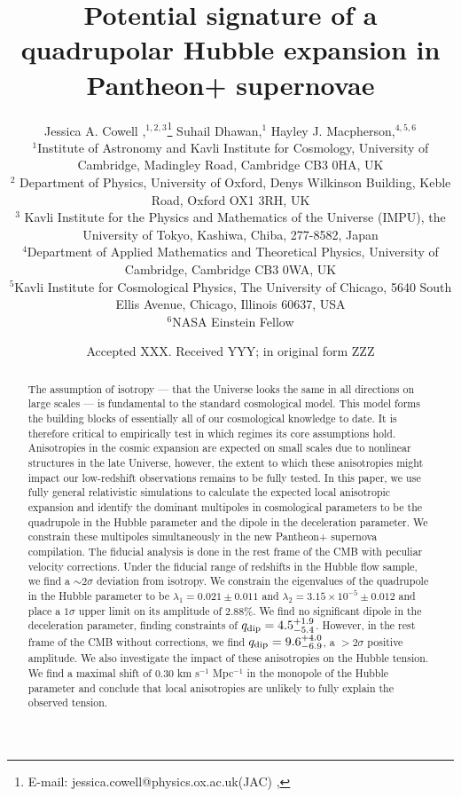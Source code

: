 \documentclass[fleqn,usenatbib]{mnras}
\title[Constraints on a quadrupolar expansion in Pantheon+]{Potential signature of a quadrupolar Hubble expansion in Pantheon+ supernovae}
\author[Jessica A. Cowell et al.]{
Jessica A. Cowell \orcidlink{0000-0002-7228-6621},$^{1,2, 3}$\thanks{E-mail: jessica.cowell@physics.ox.ac.uk(JAC) , 
}
Suhail Dhawan,$^{1}$
Hayley J. Macpherson,$^{4,5,6}$
\\
$^{1}$Institute of Astronomy and Kavli Institute for Cosmology, University of Cambridge, Madingley Road, Cambridge CB3 0HA, UK\\
$^{2}$ Department of Physics, University of Oxford, Denys Wilkinson Building, Keble Road, Oxford OX1 3RH, UK\\
$^{3}$ Kavli Institute for the Physics and Mathematics of the Universe (IMPU), the University of Tokyo, Kashiwa, Chiba, 277-8582, Japan\\
$^{4}$Department of Applied Mathematics and Theoretical Physics, University of Cambridge, Cambridge CB3 0WA, UK \\
$^{5}$Kavli Institute for Cosmological Physics, The University of Chicago, 5640 South Ellis Avenue, Chicago, Illinois 60637, USA \\
$^{6}$NASA Einstein Fellow
}
\date{Accepted XXX. Received YYY; in original form ZZZ}
\begin{document}
\label{firstpage}
\pagerange{\pageref{firstpage}--\pageref{lastpage}}
\maketitle

\begin{abstract}
The assumption of isotropy --- that the Universe looks the same in all directions on large scales --- is fundamental to the standard cosmological model. This model forms the building blocks of essentially all of our cosmological knowledge to date. It is therefore critical to empirically test in which regimes its core assumptions hold. Anisotropies in the cosmic expansion are expected on small scales due to nonlinear structures in the late Universe, however, the extent to which these anisotropies might impact our low-redshift observations remains to be fully tested. 
In this paper, we use fully general relativistic simulations to calculate the expected local anisotropic expansion and identify the dominant multipoles in cosmological parameters to be the quadrupole in the Hubble parameter and the dipole in the deceleration parameter. We constrain these multipoles simultaneously in the new Pantheon+ supernova compilation. The fiducial analysis is done  in the rest frame of the CMB with peculiar velocity corrections.
Under the fiducial range of redshifts in the Hubble flow sample, we find a $\sim 2\sigma$ deviation from isotropy. We constrain the  eigenvalues of the quadrupole in the Hubble parameter to be $\lambda_1 =0.021\pm{ 0.011}$ and $ {\lambda_2= 3.15\times 10^{-5}}\pm 0.012$ and place a $1\sigma$ upper limit on its amplitude of $2.88\%$. We find 
no significant dipole in the deceleration parameter,  finding constraints of  $q_{\rm dip} =  4.5^{+1.9}_{-5.4}$. However, in the rest frame of the CMB without corrections, we find $ q_{ \rm dip} = 9.6^{+4.0}_{-6.9}$, a $>2\sigma$ positive amplitude. We also investigate the impact of these anisotropies on the Hubble tension. We find a maximal shift of $0.30$ km s$^{-1}$ Mpc$^{-1}$ in the monopole of the Hubble parameter and conclude that local anisotropies are unlikely to fully explain the observed tension. 




\end{abstract}

\end{document}
